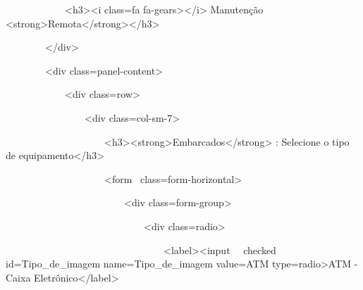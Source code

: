 {\ttfamily\color[rgb]{0.10980392,0.10980392,0.10980392}
    \ \ \ \ \ \ \ \ \ \ \ \ {\textless}h3{\textgreater}{\textless}i class={\textquotedbl}fa
        fa-gears{\textquotedbl}{\textgreater}{\textless}/i{\textgreater} Manuten\c{c}\~ao
        {\textless}strong{\textgreater}Remota{\textless}/strong{\textgreater}{\textless}/h3{\textgreater}}

{\ttfamily\color[rgb]{0.10980392,0.10980392,0.10980392}
    \ \ \ \ \ \ \ \ {\textless}/div{\textgreater}}

{\ttfamily\color[rgb]{0.10980392,0.10980392,0.10980392}
    \ \ \ \ \ \ \ \ {\textless}div class={\textquotedbl}panel-content{\textquotedbl}{\textgreater}}

{\ttfamily\color[rgb]{0.10980392,0.10980392,0.10980392}
    \ \ \ \ \ \ \ \ \ \ \ \ {\textless}div class={\textquotedbl}row{\textquotedbl}{\textgreater}}

{\ttfamily\color[rgb]{0.10980392,0.10980392,0.10980392}
    \ \ \ \ \ \ \ \ \ \ \ \ \ \ \ \ {\textless}div class={\textquotedbl}col-sm-7{\textquotedbl}{\textgreater}}

{\ttfamily\color[rgb]{0.10980392,0.10980392,0.10980392}
    \ \ \ \ \ \ \ \ \ \ \ \ \ \ \ \ \ \ \ \ {\textless}h3{\textgreater}{\textless}strong{\textgreater}Embarcados{\textless}/strong{\textgreater}
    : Selecione o tipo de equipamento{\textless}/h3{\textgreater}}


    \bigskip

{\ttfamily\color[rgb]{0.10980392,0.10980392,0.10980392}
    \ \ \ \ \ \ \ \ \ \ \ \ \ \ \ \ \ \ \ \ {\textless}form
        \ class={\textquotedbl}form-horizontal{\textquotedbl}{\textgreater}}

{\ttfamily\color[rgb]{0.10980392,0.10980392,0.10980392}
    \ \ \ \ \ \ \ \ \ \ \ \ \ \ \ \ \ \ \ \ \ \ \ \ {\textless}div
        class={\textquotedbl}form-group{\textquotedbl}{\textgreater}}

{\ttfamily\color[rgb]{0.10980392,0.10980392,0.10980392}
    \ \ \ \ \ \ \ \ \ \ \ \ \ \ \ \ \ \ \ \ \ \ \ \ \ \ \ \ {\textless}div
        class={\textquotedbl}radio{\textquotedbl}{\textgreater}}

{\ttfamily\color[rgb]{0.10980392,0.10980392,0.10980392}
    \ \ \ \ \ \ \ \ \ \ \ \ \ \ \ \ \ \ \ \ \ \ \ \ \ \ \ \ \ \ \ \ {\textless}label{\textgreater}{\textless}input
        \ \ checked id={\textquotedbl}Tipo\_de\_imagem{\textquotedbl} name={\textquotedbl}Tipo\_de\_imagem{\textquotedbl}
    value={\textquotedbl}ATM{\textquotedbl} type={\textquotedbl}radio{\textquotedbl}{\textgreater}ATM - Caixa
        Eletr\^onico{\textless}/label{\textgreater}}

